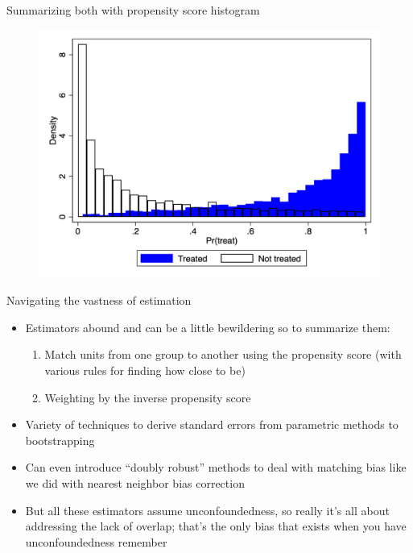 \documentclass{beamer}
\begin{document}
\begin{frame}{Summarizing both with propensity score histogram}

  \begin{figure}
    \includegraphics[scale=0.25]{./lecture_includes/pscore_histogram}
  \end{figure}
  
\end{frame}







\begin{frame}{Navigating the vastness of estimation}

\begin{itemize}
\item Estimators abound and can be a little bewildering so to summarize them:
	\begin{enumerate}
	\item Match units from one group to another using the propensity score (with various rules for finding how close to be)
	\item Weighting by the inverse propensity score
	\end{enumerate}
\item Variety of techniques to derive standard errors from parametric methods to bootstrapping
\item Can even introduce ``doubly robust'' methods to deal with matching bias like we did with nearest neighbor bias correction
\item But all these estimators assume unconfoundedness, so really it's all about addressing the lack of overlap; that's the only bias that exists when you have unconfoundedness remember
\end{itemize}

\end{frame}
\end{document}
